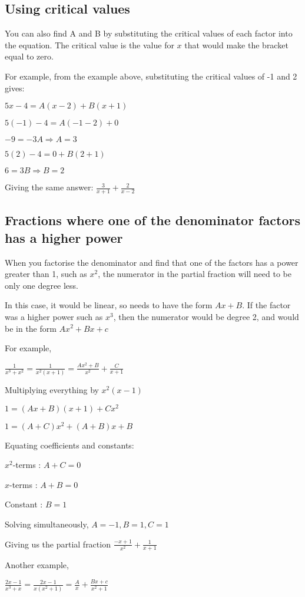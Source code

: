 \documentclass[../main.tex]{subfiles}
\begin{document}
\subsection*{Using critical values}
You can also find A and B by substituting the critical values of each factor into the equation. The critical value is the value for $x$ that would make the bracket equal to zero.

For example, from the example above, substituting the critical values of -1 and 2 gives:

$5x-4=A(x-2)+B(x+1)$

$5(-1)-4=A(-1-2)+0$

$-9=-3A \Rightarrow A=3$

$5(2)-4=0+B(2+1)$

$6=3B \Rightarrow B=2$

Giving the same answer: $\frac{3}{x+1}+\frac{2}{x-2}$

\subsection*{Fractions where one of the denominator factors has a higher power}

When you factorise the denominator and find that one of the factors has a power greater than 1, such as $x^2$, the numerator in the partial fraction will need to be only one degree less. 

In this case, it would be linear, so needs to have the form $Ax + B$.
If the factor was a higher power such as $x^3$, then the numerator would be degree 2, and would be in the form $Ax^2+Bx+c$

For example,

$\frac{1}{x^3+x^2}=\frac{1}{x^2(x+1)}=\frac{Ax^2+B}{x^2}+\frac{C}{x+1}$

Multiplying everything by $x^2(x-1)$

$1=(Ax+B)(x+1)+Cx^2$

$1=(A+C)x^2+(A+B)x+B$

Equating coefficients and constants:

$x^2$-terms : $A+C=0$

$x$-terms : $A+B=0$

Constant : $B=1$

Solving simultaneously, $A=-1, B=1, C=1$

Giving us the partial fraction $\frac{-x+1}{x^2}+\frac{1}{x+1}$

Another example,

$\frac{2x-1}{x^3+x}=\frac{2x-1}{x(x^2+1)}=\frac{A}{x}+\frac{Bx+c}{x^2+1}$
\end{document}

